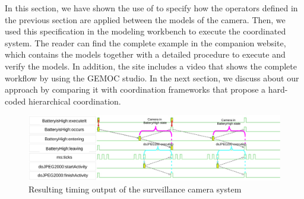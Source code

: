 In this section, we have shown the use of \bflow to specify how the operators defined in the previous section are applied between the models of the camera. Then, we used this specification in the modeling workbench to execute the coordinated system. The reader can find the complete example in the companion website, which contains the models together with a detailed procedure to execute and verify the models. In addition, the site includes a video that shows the complete workflow by using the GEMOC studio. In the next section, we discuss about our approach by comparing it with coordination frameworks that propose a hard-coded hierarchical coordination.  
		\begin{figure}
			\center
			\includegraphics[width=1\columnwidth]{examples/figs/vcdcamera}
			\caption{Resulting timing output of the surveillance camera system}
			\label{fig:camerasystem}
		\end{figure}
	
	
	